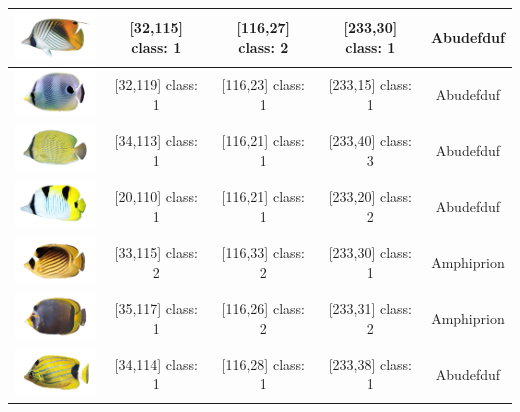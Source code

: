 \begin{longtable}{|c|c|c|c|c|}
	\includegraphics[width=3cm]{gambar/dataset_validasi/Chaetodon10} & [32,115] class: 1 & [116,27] class: 2 & [233,30] class: 1 & Abudefduf \\ \hline
	\includegraphics[width=3cm]{gambar/dataset_validasi/Chaetodon11} & [32,119] class: 1 & [116,23] class: 1 & [233,15] class: 1 & Abudefduf \\ \hline
	\includegraphics[width=3cm]{gambar/dataset_validasi/Chaetodon12} & [34,113] class: 1 & [116,21] class: 1 & [233,40] class: 3 & Abudefduf \\ \hline
	\includegraphics[width=3cm]{gambar/dataset_validasi/Chaetodon13} & [20,110] class: 1 & [116,21] class: 1 & [233,20] class: 2 & Abudefduf \\ \hline
	\includegraphics[width=3cm]{gambar/dataset_validasi/Chaetodon14} & [33,115] class: 2 & [116,33] class: 2 & [233,30] class: 1 & Amphiprion \\ \hline
	\includegraphics[width=3cm]{gambar/dataset_validasi/Chaetodon15} & [35,117] class: 1 & [116,26] class: 2 & [233,31] class: 2 & Amphiprion \\ \hline
	\includegraphics[width=3cm]{gambar/dataset_validasi/Chaetodon16} & [34,114] class: 1 & [116,28] class: 1 & [233,38] class: 1 & Abudefduf \\ \hline

\end{longtable}
